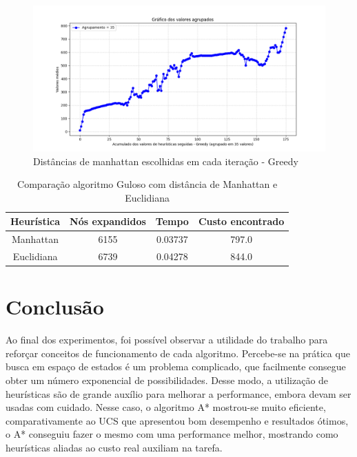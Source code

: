 \documentclass[10pt]{extarticle} %
\begin{document}
\begin{figure}[H]
    \centering
    \includegraphics[width=0.9\linewidth]{greedy_alg_dist_cumulative2.png}
    \caption{Distâncias de manhattan escolhidas em cada iteração - Greedy}
    \label{fig:enter-label}
\end{figure}

\begin{table}[h]
    \centering
    \begin{tabular}{|c|c|c|c|} \hline 
         \textbf{Heurística} & \textbf{Nós expandidos} & \textbf{Tempo} & \textbf{Custo encontrado}\\ \hline 
         Manhattan      & 6155    & 0.03737     & 797.0    \\ \hline
         Euclidiana  & 6739    & 0.04278     & 844.0   \\ \hline
    \end{tabular}
    \caption{Comparação algoritmo Guloso com distância de Manhattan e Euclidiana}
    \label{tab:comparison_with_initial}
\end{table}


\section{Conclusão}

Ao final dos experimentos, foi possível observar a utilidade do trabalho para reforçar conceitos de funcionamento de cada algoritmo. Percebe-se na prática que busca em espaço de estados é um problema complicado, que facilmente consegue obter um número exponencial de possibilidades. Desse modo, a utilização de heurísticas são de grande auxílio para melhorar a performance, embora devam ser usadas com cuidado. Nesse caso, o algoritmo A* mostrou-se muito eficiente, comparativamente ao UCS que apresentou bom desempenho e resultados ótimos, o A* conseguiu fazer o mesmo com uma performance melhor, mostrando como heurísticas aliadas ao custo real auxiliam na tarefa. 
\end{document}
